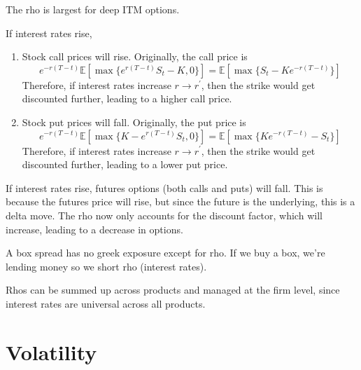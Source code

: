\documentclass{article}
\begin{document}
    The rho is largest for deep ITM options.

    \begin{theorem}
      If interest rates rise,
      \begin{enumerate}
        \item Stock call prices will rise. Originally, the call price is
        \begin{equation}
          e^{-r (T - t)} \mathbb{E}[\max\{e^{r(T - t)} S_t - K, 0\}] = \mathbb{E}[\max\{ S_t - K e^{-r (T - t)}\}]
        \end{equation}
        Therefore, if interest rates increase $r \rightarrow r^\prime$, then the strike would get discounted further, leading to a higher call price.

        \item Stock put prices will fall. Originally, the put price is
        \begin{equation}
          e^{-r (T - t)} \mathbb{E}[\max\{K - e^{r(T - t)} S_t, 0\}] = \mathbb{E}[\max\{K e^{-r (T - t)} - S_t\}]
        \end{equation}
        Therefore, if interest rates increase $r \rightarrow r^\prime$, then the strike would get discounted further, leading to a lower put price.
      \end{enumerate}
    \end{theorem}

    \begin{theorem}
      If interest rates rise, futures options (both calls and puts) will fall. This is because the futures price will rise, but since the future is the underlying, this is a delta move. The rho now only accounts for the discount factor, which will increase, leading to a decrease in options.
    \end{theorem}

    \begin{example}
      A box spread has no greek exposure except for rho. If we buy a box, we're lending money so we short rho (interest rates).
    \end{example}

    Rhos can be summed up across products and managed at the firm level, since interest rates are universal across all products.

\section{Volatility}
\end{document}
